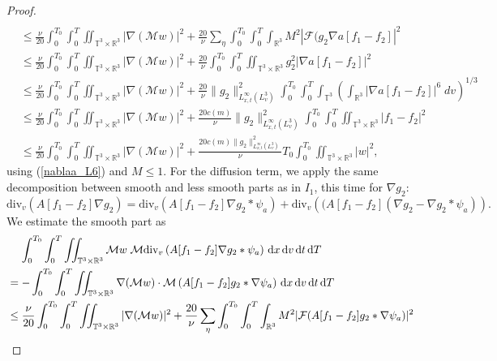 \documentclass[11pt,american, reqno]{amsart}
\numberwithin{equation}{section}
\newcommand{\R}{\mathbb R}
\newcommand{\1}{\mathds{1}}
\newcommand{\dt}{\, {\rm d} t}
\newcommand{\dT}{\, {\rm d} T}
\newcommand{\dv}{\, {\rm d} v}
\newcommand{\dx}{\, {\rm d} x}
\newcommand{\nn}{\nonumber}
\newcommand{\abs}[1]{\left\vert#1\right\vert}
\newcommand{\T}{\mathbb{T}}
\numberwithin{equation}{section}
\begin{document}
\begin{proof}
\begin{align}
\\
&\leq \frac{\nu}{20}\int_0^{T_0} \int_0^{T} \iint_{\T^3 \times \R^3}  |\nabla(\mathcal{M} w)|^2 %
+ \frac{20}{\nu} \sum_\eta \int_0^{T_0} \int_0^{T} \int_{\R^3}  {M}^2 \abs{\mathcal{F} (g_2 \nabla a[f_1-f_2]}^2 \nn %
\\
&\leq 
\frac{\nu}{20}\int_0^{T_0} \int_0^{T} \iint_{\T^3 \times \R^3}  |\nabla(\mathcal{M} w)|^2 %
+  \frac{20}{\nu}\int_0^{T_0} \int_0^{T} \iint_{\T^3 \times \R^3}   g_2^2 |\nabla a[f_1-f_2]|^2 %
\nonumber 
\\
&\leq \frac{\nu}{20}\int_0^{T_0} \int_0^{T} \iint_{\T^3 \times \R^3}  |\nabla(\mathcal{M} w)|^2 %
+ \frac{20}{\nu}\|g_2\|^2_{L_{x,t}^\infty (L^3_v)}
 \int_0^{T_0} \int_0^{T}\int_{\T^3} \left(  \int_{\mathbb{R}^3 }|\nabla a[f_1-f_2] |^6 \;dv \right)^{1/3} %
\nonumber 
\\
&\leq 
\frac{\nu}{20}\int_0^{T_0} \int_0^{T} \iint_{\T^3 \times \R^3}  |\nabla(\mathcal{M} w)|^2 %
+ \frac{20 c(m)}{\nu}\|g_2\|^2_{L_{x,t}^\infty (L^3_v)} 
 \int_0^{T_0} \int_0^{T}\iint_{\T^3 \times \R^3} |f_1-f_2 |^2 %
 \nonumber 
\\
&\leq 
\frac{\nu}{20} \int_0^{T_0}\int_0^{T} \iint_{\T^3 \times \R^3}  
|\nabla(\mathcal{M} w)|^2 %
+ \frac{20 c(m)  \|g_2\|^2_{L_{x,t}^\infty (L^3_v)}}{\nu}T_0  \int_0^{T_0}\iint_{\T^3 \times \R^3}  | w|^2, \label{I_2_partII} %
\end{align}
using (\ref{nablaa_L6}) and ${M}\le 1$. For the diffusion term, we apply the same decomposition between smooth and less smooth parts as in $I_1$, this time for $\nabla g_2$: 
$$
\textrm{div}_v \left( A[f_1-f_2] \nabla g_2\right) = \textrm{div}_v \left( A[f_1-f_2] \nabla g_2 \ast \psi_a \right) + \textrm{div}_v \left( (A[f_1-f_2] (\nabla g_2 - \nabla g_2 \ast \psi_a )\right).
$$
We estimate the smooth part as 
\begin{align*}
& \quad \,
   \int_0^{T_0} \int_0^{T} \iint_{\T^3 \times \R^3}  \mathcal{M} w \; \mathcal{M} \textrm{div}_v \left( A[f_1-f_2] \nabla g_2 \ast \psi_a \right) \dx\dv\dt\dT  
\\
& = - \int_0^{T_0} \int_0^{T} \iint_{\T^3 \times \R^3}  \nabla(\mathcal{M} w) \cdot  \mathcal{M} \left( A[f_1-f_2] g_2 \ast \nabla \psi_a \right) \dx\dv\dt\dT 
\\
& \leq  
\frac{\nu}{20}\int_0^{T_0} \int_0^{T} \iint_{\T^3 \times \R^3}  |\nabla(\mathcal{M} w)|^2 %
+  \frac{20}{\nu} \sum_\eta \int_0^{T_0} \int_0^{T} \int_{\R^3} M^2 | \mathcal{F}( A[f_1-f_2] g_2 \ast \nabla \psi_a)|^2 

\end{align*}
\end{proof}
\end{document}
